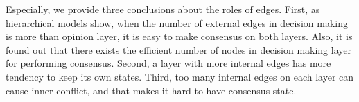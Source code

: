  Especially, we provide three conclusions about the roles of edges. First, as hierarchical models show, when the number of external edges in decision making is more than opinion layer, it is easy to make consensus on both layers.  Also, it is found out that there exists the efficient number of nodes in decision making layer for performing consensus. Second, a layer with more internal edges has more tendency to keep its own states. Third, too many internal edges on each layer can cause inner conflict, and that makes it hard to have consensus state.  